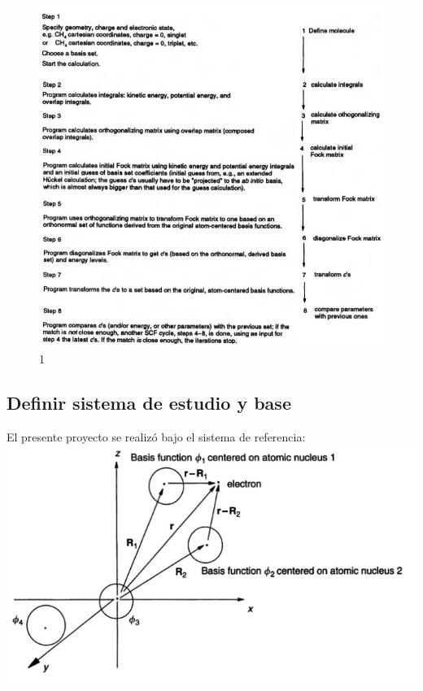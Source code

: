 \documentclass[
  letterpaper,
  DIV=11,
  numbers=noendperiod]{scrreprt}
\begin{document}
\begin{figure}

{\centering \includegraphics{./images/im22.png}

}

\caption{1}

\end{figure}

\hypertarget{definir-sistema-de-estudio-y-base-1}{%
\subsection{Definir sistema de estudio y
base}\label{definir-sistema-de-estudio-y-base-1}}

El presente proyecto se realizó bajo el sistema de referencia:
\includegraphics{./images/im11.png}
\end{document}
